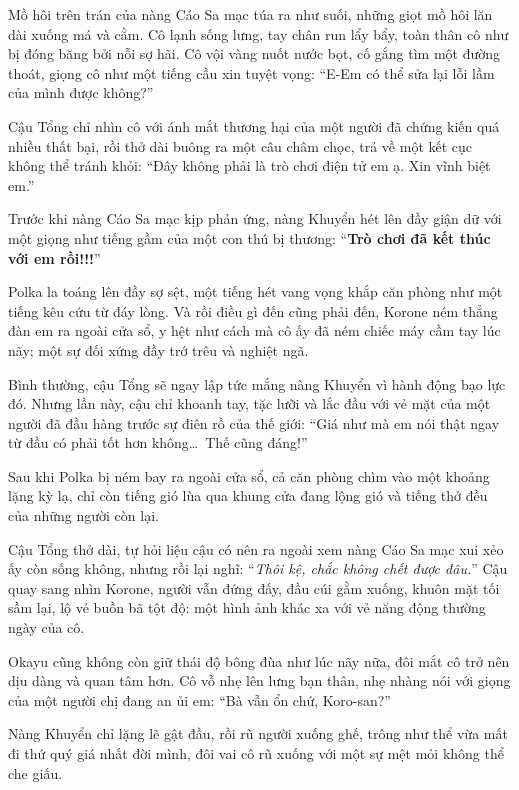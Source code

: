 \documentclass[../main.tex]{subfiles}
\begin{document}
Mồ hôi trên trán của nàng Cáo Sa mạc túa ra như suối, những giọt mồ hôi lăn dài xuống má và cằm. Cô lạnh sống lưng, tay chân run lẩy bẩy, toàn thân cô như bị đóng băng bởi nỗi sợ hãi. Cô vội vàng nuốt nước bọt, cố gắng tìm một đường thoát, giọng cô như một tiếng cầu xin tuyệt vọng: ``E-Em có thể sửa lại lỗi lầm của mình được không?''

Cậu Tổng chỉ nhìn cô với ánh mắt thương hại của một người đã chứng kiến quá nhiều thất bại, rồi thở dài buông ra một câu châm chọc, trả về một kết cục không thể tránh khỏi: ``Đây không phải là trò chơi điện tử em ạ. Xin vĩnh biệt em.''

Trước khi nàng Cáo Sa mạc kịp phản ứng, nàng Khuyển hét lên đầy giận dữ với một giọng như tiếng gầm của một con thú bị thương: ``\textbf{Trò chơi đã kết thúc với em rồi!!!}''

Polka la toáng lên đầy sợ sệt, một tiếng hét vang vọng khắp căn phòng như một tiếng kêu cứu từ đáy lòng. Và rồi điều gì đến cũng phải đến, Korone ném thẳng đàn em ra ngoài cửa sổ, y hệt như cách mà cô ấy đã ném chiếc máy cầm tay lúc nãy; một sự đối xứng đầy trớ trêu và nghiệt ngã.


Bình thường, cậu Tổng sẽ ngay lập tức mắng nàng Khuyển vì hành động bạo lực đó. Nhưng lần này, cậu chỉ khoanh tay, tặc lưỡi và lắc đầu với vẻ mặt của một người đã đầu hàng trước sự điên rồ của thế giới: ``Giá như mà em nói thật ngay từ đầu có phải tốt hơn không\dots\ Thế cũng đáng!''

\omk

Sau khi Polka bị ném bay ra ngoài cửa sổ, cả căn phòng chìm vào một khoảng lặng kỳ lạ, chỉ còn tiếng gió lùa qua khung cửa đang lộng gió và tiếng thở đều của những người còn lại.

Cậu Tổng thở dài, tự hỏi liệu cậu có nên ra ngoài xem nàng Cáo Sa mạc xui xẻo ấy còn sống không, nhưng rồi lại nghĩ: ``\textit{Thôi kệ, chắc không chết được đâu.}'' Cậu quay sang nhìn Korone, người vẫn đứng đấy, đầu cúi gằm xuống, khuôn mặt tối sầm lại, lộ vẻ buồn bã tột độ: một hình ảnh khác xa với vẻ năng động thường ngày của cô.

Okayu cũng không còn giữ thái độ bông đùa như lúc nãy nữa, đôi mắt cô trở nên dịu dàng và quan tâm hơn. Cô vỗ nhẹ lên lưng bạn thân, nhẹ nhàng nói với giọng của một người chị đang an ủi em: ``Bà vẫn ổn chứ, Koro-san?''

Nàng Khuyển chỉ lặng lẽ gật đầu, rồi rũ người xuống ghế, trông như thể vừa mất đi thứ quý giá nhất đời mình, đôi vai cô rũ xuống với một sự mệt mỏi không thể che giấu.
\end{document}
